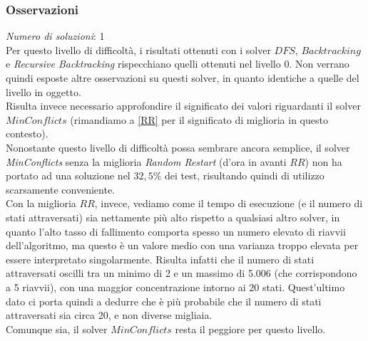 \subsubsection{Osservazioni}

\textit{Numero di soluzioni}: 1\\

Per questo livello di difficoltà, i risultati ottenuti con i solver $DFS$, $Backtracking$ e \textit{Recursive Backtracking} rispecchiano quelli ottenuti nel livello 0. Non verrano quindi esposte altre osservazioni su questi solver, in quanto identiche a quelle del livello in oggetto.\\


Risulta invece necessario approfondire il significato dei valori riguardanti il solver $MinConflicts$ (rimandiamo a \ref{RR} per il significato di miglioria in questo contesto).\\
Nonostante questo livello di difficoltà possa sembrare ancora semplice, il solver \textit{MinConflicts} senza la miglioria \textit{Random Restart} (d'ora in avanti $RR$) non ha portato ad una soluzione nel $32,5\%$ dei test, risultando quindi di utilizzo scarsamente conveniente. \\
Con la miglioria $RR$, invece, vediamo come il tempo di esecuzione (e il numero di stati attraversati) sia nettamente più alto rispetto a qualsiasi altro solver, in quanto l'alto tasso di fallimento comporta spesso un numero elevato di riavvii dell'algoritmo, ma questo è un valore medio con una varianza troppo elevata per essere interpretato singolarmente. Risulta infatti che il numero di stati attraversati oscilli tra un minimo di 2 e un massimo di 5.006 (che corrispondono a 5 riavvii), con una maggior concentrazione intorno ai 20 stati. Quest'ultimo dato ci porta quindi a dedurre che è più probabile che il numero di stati attraversati sia circa 20, e non diverse migliaia.\\
Comunque sia, il solver $MinConflicts$ resta il peggiore per questo livello.


